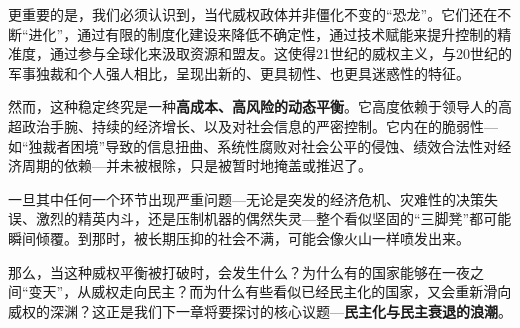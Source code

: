 更重要的是，我们必须认识到，当代威权政体并非僵化不变的“恐龙”。它们还在不断“进化”，通过有限的制度化建设来降低不确定性，通过技术赋能来提升控制的精准度，通过参与全球化来汲取资源和盟友。这使得21世纪的威权主义，与20世纪的军事独裁和个人强人相比，呈现出新的、更具韧性、也更具迷惑性的特征。

然而，这种稳定终究是一种\textbf{高成本、高风险的动态平衡}。它高度依赖于领导人的高超政治手腕、持续的经济增长、以及对社会信息的严密控制。它内在的脆弱性---如“独裁者困境”导致的信息扭曲、系统性腐败对社会公平的侵蚀、绩效合法性对经济周期的依赖---并未被根除，只是被暂时地掩盖或推迟了。

一旦其中任何一个环节出现严重问题---无论是突发的经济危机、灾难性的决策失误、激烈的精英内斗，还是压制机器的偶然失灵---整个看似坚固的“三脚凳”都可能瞬间倾覆。到那时，被长期压抑的社会不满，可能会像火山一样喷发出来。

那么，当这种威权平衡被打破时，会发生什么？为什么有的国家能够在一夜之间“变天”，从威权走向民主？而为什么有些看似已经民主化的国家，又会重新滑向威权的深渊？这正是我们下一章将要探讨的核心议题---\textbf{民主化与民主衰退的浪潮}。
